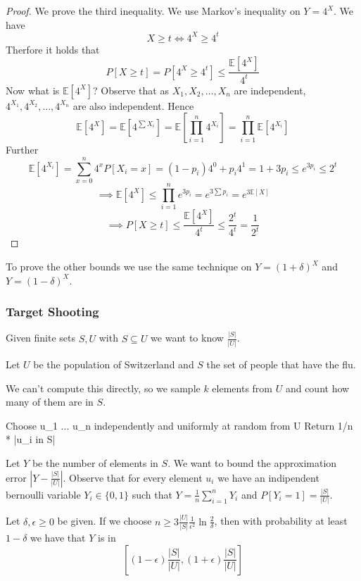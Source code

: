 \begin{proof}
    We prove the third inequality. We use Markov's inequality on $Y = 4^X$.
    We have 
    $$X \geq t \iff 4^X \geq 4^t$$
    Therfore it holds that
    $$P[X \geq t] = P[4^X \geq 4^t] \leq \frac{\mathbb{E}[4^X]}{4^t}$$
    Now what is $\mathbb{E}[4^X]$? Observe that as $X_1, X_2, \dots, X_n$ are independent, $4^{X_1}, 4^{X_2}, \dots, 4^{X_n}$ are also independent. Hence
    $$\mathbb{E}[4^X] = \mathbb{E}[4^{\sum X_i}] = \mathbb{E}[\prod_{i=1}^n 4^{X_i}] = \prod_{i=1}^n \mathbb{E}[4^{X_i}]$$
    Further
    $$\mathbb{E}[4^{X_i}] = \sum_{x=0}^n 4^x P[X_i=x] = (1-p_i) 4^0 + p_i 4^1 = 1 + 3p_i \leq e^{3p_i} \leq 2^t$$
    $$\implies \mathbb{E}[4^X] \leq \prod_{i=1}^n e^{3p_i} = e^{3\sum p_i} = e^{3\mathbb{E}[X]}$$
    $$\implies P[X \geq t] \leq \frac{\mathbb{E}[4^X]}{4^t} \leq \frac{2^t}{4^t} = \frac{1}{2^t}$$
\end{proof}

\begin{remark}
    To prove the other bounds we use the same technique on $Y = (1+\delta)^X$ and $Y = (1-\delta)^X$.
\end{remark}

\subsubsection{Target Shooting}

Given finite sets $S, U$ with $S \subseteq U$ we want to know $\frac{|S|}{|U|}$.
\begin{example}
    Let $U$ be the population of Switzerland and $S$ the set of people that have the flu.
\end{example}

We can't compute this directly, so we sample $k$ elements from $U$ and count how many of them are in $S$.

\begin{algorithm}
Choose u_1 ... u_n independently and uniformly at random from U
Return 1/n * |{u_i in S}| 
\end{algorithm}

Let $Y$ be the number of elements in $S$. We want to bound the approximation error $|Y - \frac{|S|}{|U|}|$. Observe that for every element $u_i$ we have an indipendent bernoulli variable $Y_i \in \{0,1\}$ such that $Y = \frac{1}{n} \sum_{i=1}^n Y_i$ and $P[Y_i=1] = \frac{|S|}{|U|}$.

\begin{theorem}
    Let $\delta, \epsilon \ge 0$ be given. If we choose $n \geq 3 \frac{|U|}{|S|} \frac{1}{\epsilon^2} \ln \frac{2}{\delta}$, then with probability at least $1-\delta$ we have that $Y$ is in 
    $$[(1-\epsilon)\frac{|S|}{|U|}, (1+\epsilon)\frac{|S|}{|U|}]$$
\end{theorem}

